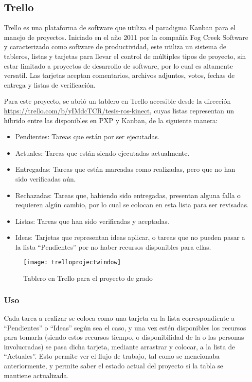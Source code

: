 \subsection{Trello}

Trello es una plataforma de software que utiliza el paradigma Kanban para el manejo de proyectos. Iniciado en el año 2011 por la compañía Fog Creek Software y caracterizado como software de productividad, este utiliza un sistema de tableros, listas y tarjetas para llevar el control de múltiples tipos de proyecto, sin estar limitado a proyectos de desarrollo de software, por lo cual es altamente versatil. Las tarjetas aceptan comentarios, archivos adjuntos, votos, fechas de entrega y listas de verificación.

Para este proyecto, se abrió un tablero en Trello accesible desde la dirección \url{https://trello.com/b/yIMdcTCR/tesis-ros-kinect}, cuyas listas representan un híbrido entre las disponibles en PXP y Kanban, de la siguiente manera:

\begin{itemize}
	\itemsep1pt \parskip1pt 
	\item Pendientes: Tareas que están por ser ejecutadas.
	\item Actuales: Tareas que están siendo ejecutadas actualmente.
	\item Entregadas: Tareas que están marcadas como realizadas, pero que no han sido verificadas aún.
	\item Rechazadas: Tareas que, habiendo sido entregadas, presentan alguna falla o requieren algún cambio, por lo cual se colocan en esta lista para ser revisadas.
	\item Listas: Tareas que han sido verificadas y aceptadas.
	\item Ideas: Tarjetas que representan ideas aplicar, o tareas que no pueden pasar a la lista ``Pendientes'' por no haber recursos disponibles para ellas.
\end{itemize}

\begin{figure}[ht]
\centering
\texttt{[image: trelloprojectwindow]}
\caption{Tablero en Trello para el proyecto de grado}
\end{figure}

\subsubsection{Uso}

Cada tarea a realizar se coloca como una tarjeta en la lista correspondiente a ``Pendientes'' o ``Ideas'' según sea el caso, y una vez estén disponibles los recursos para tomarla (siendo estos recursos tiempo, o disponibilidad de la o las personas involucradas) se pasa dicha tarjeta, mediante arrastrar y colocar, a la lista de ``Actuales''. Esto permite ver el flujo de trabajo, tal como se mencionaba anteriormente, y permite saber el estado actual del proyecto si la tabla se mantiene actualizada.

